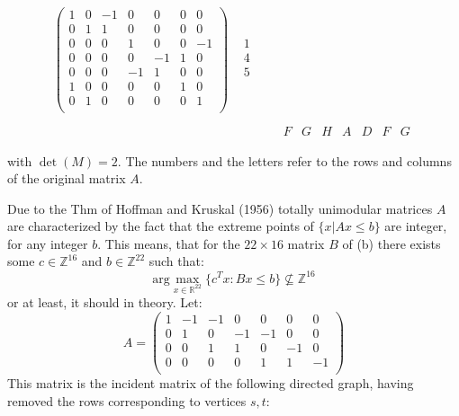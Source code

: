\documentclass[12pt]{article}
\newenvironment{a_enum}{\begin{enumerate}[label=(\alph{*})]}{\end{enumerate}} %
\begin{document}
\begin{a_enum}
$$\begin{array}{ccccccc}
\left(\begin{array}{RRR|RRRR}
 1& 0&-1& 0& 0& 0& 0\\
 0& 1& 1& 0& 0& 0& 0\\\hline
 0& 0& 0& 1& 0& 0&-1\\
 0& 0& 0& 0&-1& 1& 0\\
 0& 0& 0&-1& 1& 0& 0\\\hline
 1& 0& 0& 0& 0& 1& 0\\
 0& 1& 0& 0& 0& 0& 1\\
\end{array}\right)&
\begin{array}{c}\phantom{A}\\\phantom{A}\\1\\4\\5\\\phantom{A}\\\phantom{A}\\\end{array}\\
\\
&&&\begin{array}{RRR|RRRR}
F&G&H&A&D&F&G\\
\end{array}\\
\end{array}$$
with \href{https://www.wolframalpha.com/input/?i=det\%5B(1,0,-1,0,0,0,0),(0,1,1,0,0,0,0),(0,0,0,1,0,0,-1),(0,0,0,0,-1,1,0),(0,0,0,-1,1,0,0),(1,0,0,0,0,1,0),(0,1,0,0,0,0,1)\%5D}{$\det(M)=2$}. The numbers and the letters refer to the rows and columns of the original matrix $A$.
\item Due to the Thm of Hoffman and Kruskal (1956) totally unimodular matrices $A$ are characterized by the fact that the extreme points of $\{x|Ax\leq b\}$ are integer, for any integer $b$. This means, that for the $22\times 16$ matrix $B$ of (b) there exists some $c\in\mathbb{Z}^{16}$ and $b\in\mathbb{Z}^{22}$ such that:
$$\mathrm{arg}\max_{x\in\mathbb{R}^{22}}\{c^Tx:Bx\leq b\}\not\subseteq\mathbb{Z}^{16}$$
or at least, it should in theory. Let:
$$A=\left(\begin{array}{ccccccc}
1&-1&-1&0&0&0&0\\
0&1&0&-1&-1&0&0\\
0&0&1&1&0&-1&0\\
0&0&0&0&1&1&-1\\
\end{array}\right)$$
This matrix is the incident matrix of the following directed graph, having removed the rows corresponding to vertices $s,t$:

\end{a_enum}
\end{document}
